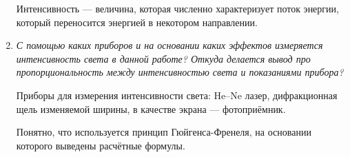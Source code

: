 \documentclass[a4paper,10pt,notitlepage,pdftex,headsepline]{scrartcl}
\begin{document}
\begin{enumerate}
Интенсивность --- величина, которая численно характеризует поток энергии, который переносится энергией в некотором направлении.
\item \textit{С помощью каких приборов и на основании каких эффектов измеряется интенсивность света в данной работе?
Откуда делается вывод про пропорциональность между интенсивностью света и показаниями прибора?}

Приборы для измерения интенсивности света: He--Ne лазер, дифракционная щель изменяемой ширины, в качестве экрана --- фотоприёмник.

Понятно, что используется принцип Гюйгенса-Френеля, на основании которого выведены расчётные формулы.
\end{enumerate}
\end{document}
